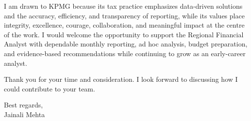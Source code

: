 \documentclass[letterpaper,11pt]{article}
\begin{document}
\bigbreak
I am drawn to KPMG because its tax practice emphasizes data-driven solutions and the accuracy, efficiency, and transparency of reporting, while its values place integrity, excellence, courage, collaboration, and meaningful impact at the centre of the work. I would welcome the opportunity to support the Regional Financial Analyst with dependable monthly reporting, ad hoc analysis, budget preparation, and evidence-based recommendations while continuing to grow as an early-career analyst.

\bigbreak
Thank you for your time and consideration. I look forward to discussing how I could contribute to your team.

\bigbreak
Best regards,\\
Jainali Mehta
\end{document}
